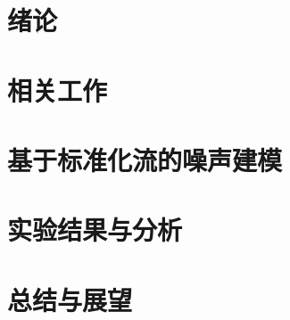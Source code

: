 \documentclass{xduugthesis}
\begin{document}
\chapter{绪论}

\chapter{相关工作}

\chapter{基于标准化流的噪声建模}

\chapter{实验结果与分析}

\chapter{总结与展望}

\end{document}
